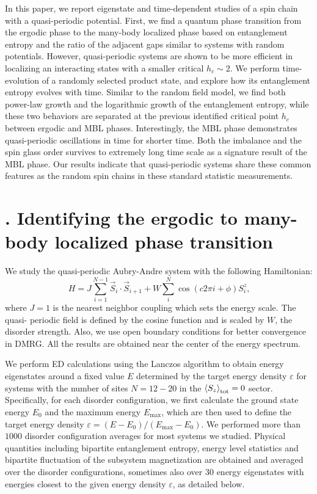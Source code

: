 \documentclass[prl,aps,epsf,showpacs,twocolumn]{revtex4}
\let\oldsection\section
\renewcommand{\section}[1]{\stepcounter{section}\oldsection{\Roman{section}. #1}}
\begin{document}
In this paper, we report  eigenstate and  time-dependent studies of a spin chain with a quasi-periodic potential.
First, we find a  quantum phase transition from the ergodic phase to the many-body localized phase based on
entanglement entropy and the ratio of the adjacent gaps similar to systems with random potentials. However, quasi-periodic
systems are shown to be more efficient in localizing an interacting states with a smaller critical $h_c \sim 2$.     
We perform time-evolution of a randomly selected  product state, and explore how its entanglement entropy
evolves with time.  Similar to the random field model, we find both power-law  growth and the logarithmic growth
of the entanglement entropy,  while these two  behaviors are separated at the previous identified critical point
$h_c$ between ergodic and MBL phases.   Interestingly,  the MBL phase demonstrates quasi-periodic oscillations
in time for shorter time.  Both the imbalance and the spin glass order survives to extremely long time scale
as a signature result of the MBL phase.   Our results indicate that quasi-periodic systems share these common
features as the random spin chains in these standard statistic measurements. 



\section{Identifying the ergodic to many-body localized phase transition}

We study the quasi-periodic Aubry-Andre system with the following Hamiltonian:
\begin{equation*}
  H =  J\sum_{i=1}^{N-1} \vec{S}_i \cdot \vec{S}_{i+1} +
  W\sum_{i}^{N} \cos(c2\pi i+\phi) S_i^z \text{,}
\end{equation*}
where $J=1$ is the nearest neighbor coupling which sets the energy scale. The quasi-
periodic field is defined by the cosine function and is scaled by $W$, the disorder
strength. Also, we use open boundary conditions for better convergence in DMRG. All
the results are obtained near the center of the energy spectrum.


We perform ED calculations using the Lanczos algorithm to obtain energy eigenstates
around a fixed value $E$ determined by the target energy density $\varepsilon$ for
systems with the number of sites $N=12-20$ in the $\braket{S_z}_{\text{tot}}=0$ sector.
Specifically, for each disorder configuration, we first calculate the ground state
energy $E_0$ and the maximum energy $E_\text{max}$, which are then used to define the
target energy density $\varepsilon = (E-E_0)/(E_\text{max} -E_0)$. We performed more
than $1000$ disorder configuration averages for most systems we studied. Physical
quantities\cite{luitz2015} including bipartite entanglement entropy, energy level
statistics and bipartite fluctuation of the subsystem magnetization are obtained and
averaged over the disorder configurations, sometimes also over 30 energy eigenstates
with energies closest to the given energy density $\varepsilon$, as detailed below.
\end{document}
